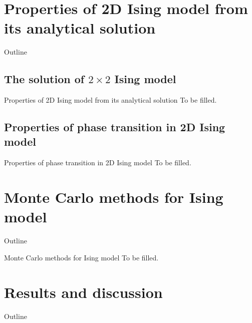 \documentclass{beamer}
\begin{document}
\section{Properties of 2D Ising model from its analytical solution}

\begin{frame}{Outline}
\tableofcontents[currentsection]
\end{frame}

\subsection{The solution of $2 \times 2$ Ising model}
\begin{frame}{Properties of 2D Ising model from its analytical solution}
To be filled. 
\end{frame}

\subsection{Properties of phase transition in 2D Ising model}
\begin{frame}{Properties of phase transition in 2D Ising model}
To be filled. 
\end{frame}

\section{Monte Carlo methods for Ising model}
\begin{frame}{Outline}
\tableofcontents[currentsection]
\end{frame}

\begin{frame}{Monte Carlo methods for Ising model}
To be filled. 
\end{frame}

\section{Results and discussion}
\begin{frame}{Outline}
\tableofcontents[currentsection]
\end{frame}
\end{document}
